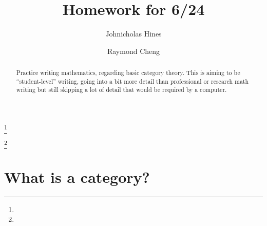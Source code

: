 \documentclass{proc-l}
\theoremstyle{definition}
\theoremstyle{remark}
\numberwithin{equation}{section}
\begin{document}
\title[homework for 6/24]{Homework for 6/24}


\author[Johnicholas Hines]{Johnicholas Hines}
\address{}
\curraddr{}
\email{}
\thanks{}

\author[Raymond Cheng]{Raymond Cheng}
\address{}
\curraddr{}
\email{}
\thanks{}


\date{}

\dedicatory{}


\begin{abstract}
Practice writing mathematics, regarding basic category theory.
This is aiming to be ``student-level'' writing, 
going into a bit more detail than professional or research
math writing but still skipping a lot of detail that would
be required by a computer.
\end{abstract}

\maketitle

\section{What is a category?}
\end{document}
